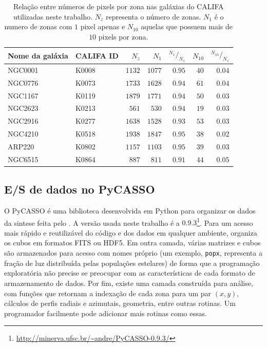 \begin{table}
	\caption[Relação de pixels e zonas em algumas galáxias do CALIFA]
	{Relação entre números de pixels por zona nas galáxias do CALIFA utilizadas
	neste trabalho. $N_z$ representa o número de zonas. $N_1$ é o numero de zonas
	com $1$ pixel apenas e $N_{10}$ aquelas que possuem mais de $10$ pixels por
	zona.}
	\begin{tabular}{l l r r r r r}
		Nome da galáxia & CALIFA ID & $N_z$ & $N_{1}$ & ${}^{N_1}/_{N_z}$ & 
		$N_{10}$ & ${}^{N_{10}}/_{N_z}$ \\
		\midrule
		NGC0001 & K0008 & $1132$ & $1077$ & $0.95$ & $40$ & $0.04$ \\
		NGC0776 & K0073 & $1733$ & $1628$ & $0.94$ & $61$ & $0.04$ \\
		NGC1167 & K0119 & $1879$ & $1771$ & $0.94$ & $50$ & $0.03$ \\
		NGC2623 & K0213 & $561$ & $530$ & $0.94$ & $19$ & $0.03$ \\
		NGC2916 & K0277 & $1638$ & $1528$ & $0.93$ & $53$ & $0.03$ \\
		NGC4210 & K0518 & $1938$ & $1847$ & $0.95$ & $38$ & $0.02$ \\
		ARP220 & K0802 & $1157$ & $1103$ & $0.95$ & $39$ & $0.03$ \\
		NGC6515 & K0864 & $887$ & $811$ & $0.91$ & $44$ & $0.05$ \\
	\end{tabular}
	\label{tab:pixelZones}
\end{table}
\subsection{E/S de dados no PyCASSO}

O PyCASSO é uma biblioteca desenvolvida em Python para organizar os dados da
sintese feita pelo \starlight. A versão usada neste trabalho é a
$0.9.3$\footnote{\url{http://minerva.ufsc.br/~andre/PyCASSO-0.9.3/}}. Para um
acesso mais rápido e reutilizável do código e dos dados em qualquer ambiente,
organiza os cubos em formatos FITS ou HDF5. Em outra camada, várias matrizes e
cubos são armazenados para acesso com nomes próprio (um exemplo, \texttt{popx},
representa a fração de luz distribuída pelas populações estelares) de forma que
a programação exploratória não precise se preocupar com as características de
cada formato de armazenamento de dados. Por fim, existe uma camada construída
para análise, com funções que retornam a indexação de cada zona para um par $(x,
y)$, cálculos de perfis radiais e azimutais, geometria, entre outras rotinas. Um
programador facilmente pode adicionar mais rotinas como essas.

